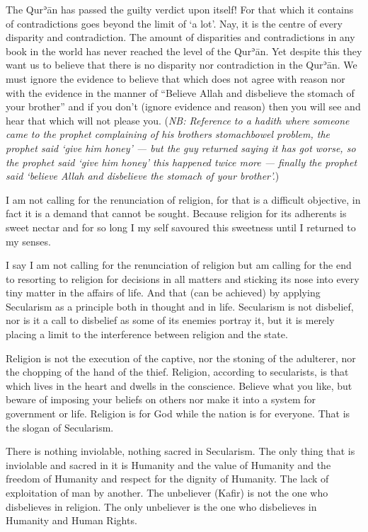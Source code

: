 \documentclass[12pt]{memoir}
\def\´{ʾ} %
\def \Quran{Qur\-\´ān} %
\let \Qrn=\Quran      %
\def\/{\discretionary{/}{}{/}}
\newcommand{\NB}[1]{\emph{\small NB: #1}}
\begin{document}
The \Qrn{} has passed the guilty verdict upon itself! For that which it
contains of contradictions goes beyond the limit of ‘a lot’. Nay, it is the
centre of every disparity and contradiction. The amount of disparities and
contradictions in any book in the world has never reached the level of the
\Quran. Yet despite this they want us to believe that there is no disparity nor
contradiction in the \Quran. We must ignore the evidence to believe that which
does not agree with reason nor with the evidence in the manner of “Believe
Allah and disbelieve the stomach of your brother”
and if you don’t (ignore evidence and reason) then you will see and hear that
which will not please you.
(\NB{Reference to a hadith where someone came to the prophet complaining of his
brothers stomach\/bowel problem, the prophet said ‘give him honey’ —
but the guy
returned saying it has got worse, so the prophet said ‘give him honey’ this
happened twice more — finally the prophet said ‘believe Allah and disbelieve
the stomach of your brother’.})

I am not calling for the renunciation of religion, for that is a difficult
objective, in fact it is a demand that cannot be sought. Because religion for
its adherents is sweet nectar and for so long I my self savoured this sweetness
until I returned to my senses.

I say I am not calling for the renunciation of religion but am calling for the
end to resorting to religion for decisions in all matters and sticking its nose
into every tiny matter in the affairs of life. And that (can be achieved) by
applying Secularism as a principle both in thought and in life. Secularism is
not disbelief, nor is it a call to disbelief as some of its enemies portray
it, but it is merely placing a limit to the interference between religion and
the state.

Religion is not the execution of the captive, nor the stoning of the adulterer,
nor the chopping of the hand of the thief. Religion, according to secularists,
is that which lives in the heart and dwells in the conscience. Believe what you
like, but beware of imposing your beliefs on others nor make it into a
system for government or life. Religion is for God while the nation is for
everyone. That is the slogan of Secularism.

There is nothing inviolable, nothing sacred in Secularism. The only thing that
is inviolable and sacred in it is Humanity and the value of Humanity and the
freedom of Humanity and respect for the dignity of Humanity. The lack of
exploitation of man by another. The unbeliever (Kafir) is not the one who
disbelieves in religion. The only unbeliever is the one who disbelieves in
Humanity and Human Rights.
\end{document}
